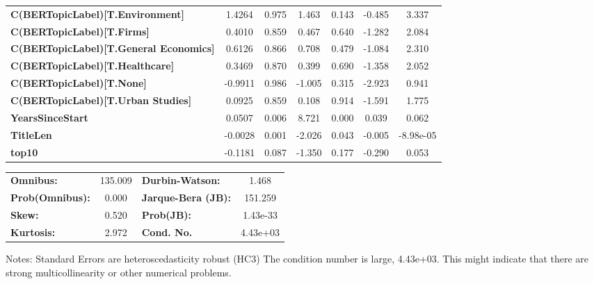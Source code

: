 \begin{center}
\begin{tabular}{lcccccc}
\textbf{C(BERTopicLabel)[T.Environment]}       &       1.4264  &        0.975     &     1.463  &         0.143        &       -0.485    &        3.337     \\
\textbf{C(BERTopicLabel)[T.Firms]}             &       0.4010  &        0.859     &     0.467  &         0.640        &       -1.282    &        2.084     \\
\textbf{C(BERTopicLabel)[T.General Economics]} &       0.6126  &        0.866     &     0.708  &         0.479        &       -1.084    &        2.310     \\
\textbf{C(BERTopicLabel)[T.Healthcare]}        &       0.3469  &        0.870     &     0.399  &         0.690        &       -1.358    &        2.052     \\
\textbf{C(BERTopicLabel)[T.None]}              &      -0.9911  &        0.986     &    -1.005  &         0.315        &       -2.923    &        0.941     \\
\textbf{C(BERTopicLabel)[T.Urban Studies]}     &       0.0925  &        0.859     &     0.108  &         0.914        &       -1.591    &        1.775     \\
\textbf{YearsSinceStart}                       &       0.0507  &        0.006     &     8.721  &         0.000        &        0.039    &        0.062     \\
\textbf{TitleLen}                              &      -0.0028  &        0.001     &    -2.026  &         0.043        &       -0.005    &    -8.98e-05     \\
\textbf{top10}                                 &      -0.1181  &        0.087     &    -1.350  &         0.177        &       -0.290    &        0.053     \\
\bottomrule
\end{tabular}
\begin{tabular}{lclc}
\textbf{Omnibus:}       & 135.009 & \textbf{  Durbin-Watson:     } &    1.468  \\
\textbf{Prob(Omnibus):} &   0.000 & \textbf{  Jarque-Bera (JB):  } &  151.259  \\
\textbf{Skew:}          &   0.520 & \textbf{  Prob(JB):          } & 1.43e-33  \\
\textbf{Kurtosis:}      &   2.972 & \textbf{  Cond. No.          } & 4.43e+03  \\
\bottomrule
\end{tabular}
\end{center}

Notes: \newline
 [1] Standard Errors are heteroscedasticity robust (HC3) \newline
 [2] The condition number is large, 4.43e+03. This might indicate that there are \newline
 strong multicollinearity or other numerical problems.